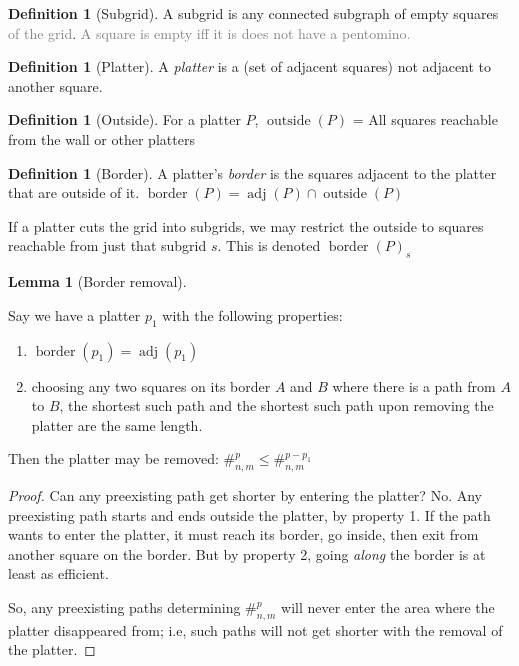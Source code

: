 \documentclass{article}
\theoremstyle{definition}%
\newtheorem{lemma}[theorem]{Lemma}
\newtheorem{definition}[theorem]{Definition}
\newcommand{\minordetail}[1]{\textcolor{gray}{#1}}
\newcommand{\newterm}[1]{\textit{#1}}
\newcommand{\adj}{\operatorname{adj}}
\newcommand{\border}{\operatorname{border}}
\newcommand{\outside}{\operatorname{outside}}
\begin{document}
\begin{definition}[Subgrid]
A subgrid is any connected subgraph of empty squares \minordetail{of the grid}. \minordetail{A square is empty iff it is does not have a pentomino.}
\end{definition}

\begin{definition}[Platter]
A \newterm{platter} is a (set of adjacent squares) not adjacent to another square.%
\end{definition}

\begin{definition}[Outside]
For a platter $P$, $\outside(P)$ = All squares reachable from the wall or other platters
\end{definition}

\begin{definition}[Border]
A platter's \newterm{border} is the squares adjacent to the platter that are outside of it. $\border(P) = \adj(P) \cap \outside(P)$

If a platter cuts the grid into subgrids, we may restrict the outside to squares reachable from just that subgrid $s$. This is denoted $\border(P)_s$
\end{definition}

\begin{lemma}[Border removal]
\label{lem:Border removal}

Say we have a platter $p_1$ with the following properties:

\begin{enumerate}
\item $\border(p_1) = \adj(p_1)$
\item choosing any two squares on its border $A$ and $B$ where there is a path from $A$ to $B$, the shortest such path and the shortest such path upon removing the platter are the same length.
\end{enumerate}

Then the platter may be removed: $\#^{p}_{n, m} \le \#^{p - p_1}_{n, m}$
\end{lemma}

\begin{proof}
Can any preexisting path get shorter by entering the platter? No. Any preexisting path starts and ends outside the platter, by property 1. If the path wants to enter the platter, it must reach its border, go inside, then exit from another square on the border. But by property 2, going \emph{along} the border is at least as efficient.

So, any preexisting paths determining $\#^{p}_{n, m}$ will never enter the area where the platter disappeared from; i.e, such paths will not get shorter with the removal of the platter.
\end{proof}
\end{document}
